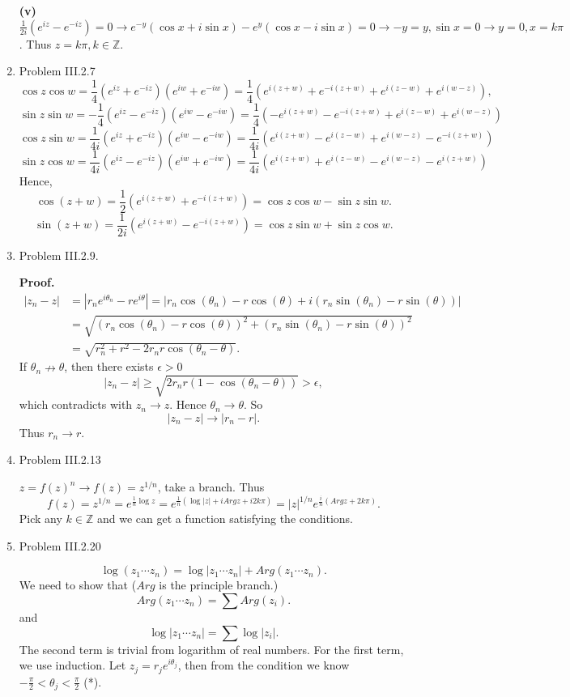 \documentclass{article}%
\begin{document}
\begin{enumerate}
\textbf{(v)} $\frac{1}{2i}(e^{iz}-e^{-iz}) = 0 \to e^{-y}(\cos x+i\sin x)-e^y(\cos x-i\sin x) = 0 \to -y = y, \sin x = 0 \to y = 0, x = k\pi $. Thus $z = k\pi, k\in\mathbb{Z}$.

\item Problem III.2.7
$$
\cos z\cos w = \frac{1}{4}(e^{iz}+e^{-iz})(e^{iw}+e^{-iw}) = \frac{1}{4}(e^{i(z+w)}+e^{-i(z+w)}+e^{i(z-w)}+e^{i(w-z)}),
$$
$$
\sin z\sin w = -\frac{1}{4}(e^{iz}-e^{-iz})(e^{iw}-e^{-iw}) = \frac{1}{4}(-e^{i(z+w)}-e^{-i(z+w)}+e^{i(z-w)}+e^{i(w-z)})
$$
$$
\cos z\sin w = \frac{1}{4i}(e^{iz}+e^{-iz})(e^{iw}-e^{-iw}) = \frac{1}{4i}(e^{i(z+w)}-e^{i(z-w)}+e^{i(w-z)}-e^{-i(z+w)})
$$
$$
\sin z\cos w = \frac{1}{4i}(e^{iz}-e^{-iz})(e^{iw}+e^{-iw}) = \frac{1}{4i}(e^{i(z+w)}+e^{i(z-w)}-e^{i(w-z)}-e^{i(z+w)})
$$
Hence, 
$$
\cos(z+w) = \frac{1}{2}(e^{i(z+w)}+e^{-i(z+w)}) = \cos z\cos w-\sin z\sin w.
$$
$$
\sin(z+w) = \frac{1}{2i}(e^{i(z+w)}-e^{-i(z+w)}) = \cos z\sin w+\sin z\cos w.
$$

\item Problem III.2.9.

\textbf{Proof.} 
$$
\begin{aligned}
|z_n-z| &= |r_ne^{i\theta_n}-re^{i\theta}| = |r_n\cos(\theta_n)-r\cos(\theta) + i(r_n\sin(\theta_n)-r\sin(\theta))| \\
&= \sqrt{(r_n\cos(\theta_n)-r\cos(\theta))^2+(r_n\sin(\theta_n)-r\sin(\theta))^2} \\
&= \sqrt{r_n^2+r^2-2r_nr\cos(\theta_n-\theta)}.
\end{aligned}
$$
If $\theta_n \nrightarrow \theta $, then there exists $\epsilon > 0$
$$
|z_n-z| \ge \sqrt{2r_nr(1-\cos(\theta_n-\theta))} > \epsilon,
$$
which contradicts with $z_n\to z $. Hence $\theta_n\to \theta $. So
$$
|z_n-z| \to |r_n-r|.
$$
Thus $r_n\to r $.

\item Problem III.2.13

$z = f(z)^n \to f(z) = z^{1/n} $, take a branch. Thus
$$
f(z) = z^{1/n} = e^{\frac{1}{n}\log z} = e^{\frac{1}{n} (\log |z| + iArg z+ i2k\pi)} = |z|^{1/n}e^{\frac{i}{n}(Argz+2k\pi)}.
$$
Pick any $k\in\mathbb{Z}$ and we can get a function satisfying the conditions.

\item Problem III.2.20

$$
\log(z_1\cdots z_n) = \log|z_1\cdots z_n|+ Arg(z_1\cdots z_n).
$$
We need to show that ($Arg$ is the principle branch.)
$$
Arg(z_1\cdots z_n) = \sum Arg(z_i).
$$
and
$$
\log|z_1\cdots z_n| = \sum\log|z_i|.
$$
The second term is trivial from logarithm of real numbers. For the first term, we use induction. Let $z_j = r_je^{i\theta_j} $, then from the condition we know $-\frac{\pi}{2} < \theta_j < \frac{\pi}{2}$ (*).


\end{enumerate}
\end{document}
